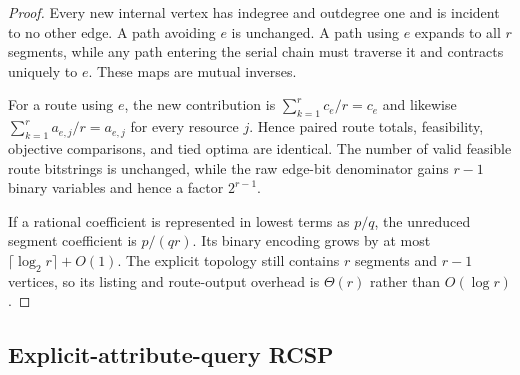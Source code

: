 \begin{proof}
Every new internal vertex has indegree and outdegree one and is incident to no
other edge. A path avoiding $e$ is unchanged. A path using $e$ expands to all
$r$ segments, while any path entering the serial chain must traverse it and
contracts uniquely to $e$. These maps are mutual inverses.

For a route using $e$, the new contribution is
$\sum_{k=1}^{r}c_e/r=c_e$ and likewise
$\sum_{k=1}^{r}a_{e,j}/r=a_{e,j}$ for every resource $j$. Hence paired route
totals, feasibility, objective comparisons, and tied optima are identical.
The number of valid feasible route bitstrings is unchanged, while the raw
edge-bit denominator gains $r-1$ binary variables and hence a factor
$2^{r-1}$.

If a rational coefficient is represented in lowest terms as $p/q$, the
unreduced segment coefficient is $p/(qr)$. Its binary encoding grows by at
most $\lceil\log_2r\rceil+O(1)$. The explicit topology still contains $r$
segments and $r-1$ vertices, so its listing and route-output overhead is
$\Theta(r)$ rather than $O(\log r)$.
\end{proof}

\subsection{Explicit-attribute-query RCSP}

